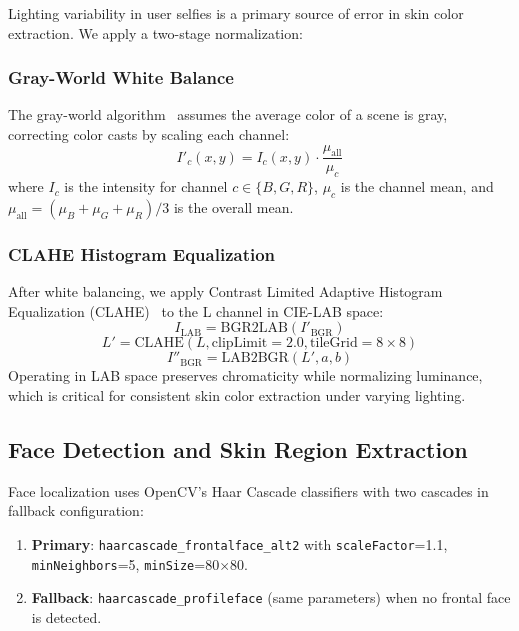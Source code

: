 \documentclass[conference]{IEEEtran}
\begin{document}
Lighting variability in user selfies is a primary source of error in skin color extraction. We apply a two-stage normalization:

\subsubsection{Gray-World White Balance}
The gray-world algorithm~\cite{buchsbaum1980} assumes the average color of a scene is gray, correcting color casts by scaling each channel:
\begin{equation}
I'_c(x,y) = I_c(x,y) \cdot \frac{\mu_{\text{all}}}{\mu_c}
\label{eq:gray_world}
\end{equation}
where $I_c$ is the intensity for channel $c \in \{B, G, R\}$, $\mu_c$ is the channel mean, and $\mu_{\text{all}} = (\mu_B + \mu_G + \mu_R) / 3$ is the overall mean.

\subsubsection{CLAHE Histogram Equalization}
After white balancing, we apply Contrast Limited Adaptive Histogram Equalization (CLAHE)~\cite{pizer1987} to the L channel in CIE-LAB space:
\begin{equation}
I_{\text{LAB}} = \text{BGR2LAB}(I'_{\text{BGR}})
\end{equation}
\begin{equation}
L' = \text{CLAHE}(L, \text{clipLimit}=2.0, \text{tileGrid}=8 \times 8)
\end{equation}
\begin{equation}
I''_{\text{BGR}} = \text{LAB2BGR}(L', a, b)
\end{equation}
Operating in LAB space preserves chromaticity while normalizing luminance, which is critical for consistent skin color extraction under varying lighting.

\subsection{Face Detection and Skin Region Extraction}

Face localization uses OpenCV's Haar Cascade classifiers with two cascades in fallback configuration:

\begin{enumerate}
    \item \textbf{Primary}: \texttt{haarcascade\_frontalface\_alt2} with \texttt{scaleFactor}=1.1, \texttt{minNeighbors}=5, \texttt{minSize}=80$\times$80.
    \item \textbf{Fallback}: \texttt{haarcascade\_profileface} (same parameters) when no frontal face is detected.
\end{enumerate}
\end{document}
